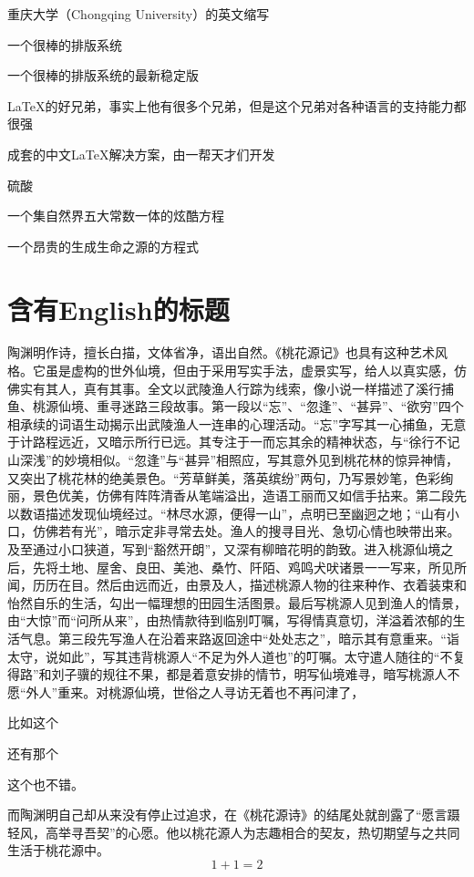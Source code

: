 \documentclass[type=bachelor,printmode=twoside]{cquthesis}
\begin{document}
	\frontmatter
	
	
	\makecover
	\cleardoublepage
	\tableofcontents
	\listofequations
\begin{denotation}[10mm][40mm]
	\item[CQU] 重庆大学（Chongqing University）的英文缩写
	\item[\LaTeX] 一个很棒的排版系统
	\item[\LaTeXe] 一个很棒的排版系统的最新稳定版
	\item[XeTeX] \LaTeX{}的好兄弟，事实上他有很多个兄弟，但是这个兄弟对各种语言的支持能力都很强
	\item[CTeX宏集] 成套的中文\LaTeX{}解决方案，由一帮天才们开发
	\item[\ce{H2SO4}] 硫酸
	\item[$ e^{\pi{}i}+1=0$] 一个集自然界五大常数一体的炫酷方程
	\item[\ce{2H2 + O2 -> 2H2O}] 一个昂贵的生成生命之源的方程式
\end{denotation}
	\mainmatter
	\chapter{含有English的标题}
	陶渊明作诗，擅长白描，文体省净，语出自然。《桃花源记》也具有这种艺术风格。它虽是虚构的世外仙境，但由于采用写实手法，虚景实写，给人以真实感，仿佛实有其人，真有其事。全文以武陵渔人行踪为线索，像小说一样描述了溪行捕鱼、桃源仙境、重寻迷路三段故事。第一段以“忘”、“忽逢”、“甚异”、“欲穷”四个相承续的词语生动揭示出武陵渔人一连串的心理活动。“忘”字写其一心捕鱼，无意于计路程远近，又暗示所行已远。其专注于一而忘其余的精神状态，与“徐行不记山深浅”的妙境相似。“忽逢”与“甚异”相照应，写其意外见到桃花林的惊异神情，又突出了桃花林的绝美景色。“芳草鲜美，落英缤纷”两句，乃写景妙笔，色彩绚丽，景色优美，仿佛有阵阵清香从笔端溢出，造语工丽而又如信手拈来。第二段先以数语描述发现仙境经过。“林尽水源，便得一山”，点明已至幽迥之地；“山有小口，仿佛若有光”，暗示定非寻常去处。渔人的搜寻目光、急切心情也映带出来。及至通过小口狭道，写到“豁然开朗”，又深有柳暗花明的韵致。进入桃源仙境之后，先将土地、屋舍、良田、美池、桑竹、阡陌、鸡鸣犬吠诸景一一写来，所见所闻，历历在目。然后由远而近，由景及人，描述桃源人物的往来种作、衣着装束和怡然自乐的生活，勾出一幅理想的田园生活图景。最后写桃源人见到渔人的情景，由“大惊”而“问所从来”，由热情款待到临别叮嘱，写得情真意切，洋溢着浓郁的生活气息。第三段先写渔人在沿着来路返回途中“处处志之”，暗示其有意重来。“诣太守，说如此”，写其违背桃源人“不足为外人道也”的叮嘱。太守遣人随往的“不复得路”和刘子骥的规往不果，都是着意安排的情节，明写仙境难寻，暗写桃源人不愿“外人”重来。对桃源仙境，世俗之人寻访无着也不再问津了，\begin{enumerate*}
		\item 比如这个
		\item 还有那个
		\item 这个也不错。
	\end{enumerate*}
	而陶渊明自己却从来没有停止过追求，在《桃花源诗》的结尾处就剖露了“愿言蹑轻风，高举寻吾契”的心愿。他以桃花源人为志趣相合的契友，热切期望与之共同生活于桃花源中。
	\begin{equation}
	1 + 1 = 2
	\end{equation}
	\label{eq:bc}
	
\end{document}
